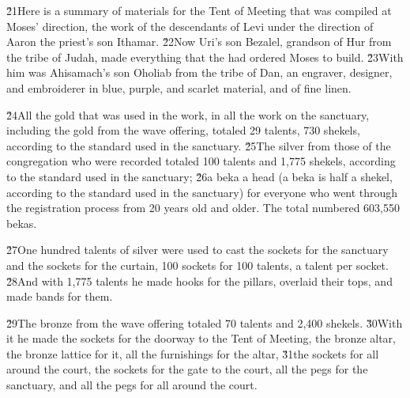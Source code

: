 \v{21}Here is a summary of materials for the Tent of Meeting that was compiled at Moses' direction, the work of the descendants of Levi under the direction of Aaron the priest's son Ithamar. \v{22}Now Uri's son Bezalel, grandson of Hur from the tribe of Judah, made everything that the  had ordered Moses to build. \v{23}With him was Ahisamach's son Oholiab from the tribe of Dan, an engraver, designer, and embroiderer in blue, purple, and scarlet material, and of fine linen.

\v{24}All the gold that was used in the work, in all the work on the sanctuary, including the gold from the wave offering, totaled 29 talents, 730 shekels, according to the standard used in the sanctuary. \v{25}The silver from those of the congregation who were recorded totaled 100 talents and 1,775 shekels, according to the standard used in the sanctuary; \v{26}a beka a head (a beka is half a shekel, according to the standard used in the sanctuary) for everyone who went through the registration process from 20 years old and older. The total numbered 603,550 bekas.

\v{27}One hundred talents of silver were used to cast the sockets for the sanctuary and the sockets for the curtain, 100 sockets for 100 talents, a talent per socket. \v{28}And with 1,775 talents he made hooks for the pillars, overlaid their tops, and made bands for them.

\v{29}The bronze from the wave offering totaled 70 talents and 2,400 shekels. \v{30}With it he made the sockets for the doorway to the Tent of Meeting, the bronze altar, the bronze lattice for it, all the furnishings for the altar, \v{31}the sockets for all around the court, the sockets for the gate to the court, all the pegs for the sanctuary, and all the pegs for all around the court.

